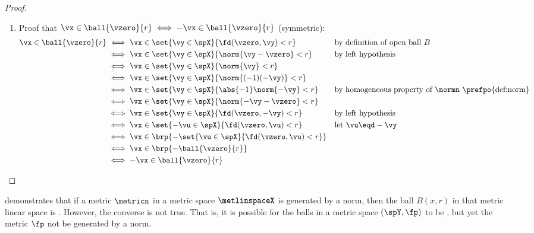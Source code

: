 \begin{proof}
\begin{enumerate}
  \item Proof that $\vx\in \ball{\vzero}{r} \iff -\vx\in \ball{\vzero}{r}$ (symmetric):
        \begin{align*}
          \vx\in \ball{\vzero}{r}
            &\iff \vx\in\set{\vy\in\spX}{\fd(\vzero,\vy)<r}
            &&    \text{by definition of open ball $B$}
          \\&\iff \vx\in\set{\vy\in\spX}{\norm{\vy-\vzero}<r}
            &&    \text{by left hypothesis}
          \\&\iff \vx\in\set{\vy\in\spX}{\norm{\vy}<r}
          \\&\iff \vx\in\set{\vy\in\spX}{\norm{(-1)(-\vy)}<r}
          \\&\iff \vx\in\set{\vy\in\spX}{\abs{-1}\norm{-\vy}<r}
            &&    \text{by homogeneous property of $\normn$ \prefpo{def:norm}}
          \\&\iff \vx\in\set{\vy\in\spX}{\norm{-\vy-\vzero}<r}
          \\&\iff \vx\in\set{\vy\in\spX}{\fd(\vzero,-\vy)<r}
            &&    \text{by left hypothesis}
          \\&\iff \vx\in\set{-\vu\in\spX}{\fd(\vzero,\vu)<r}
            &&    \text{let $\vu\eqd -\vy$}
          \\&\iff \vx\in \brp{-\set{\vu\in\spX}{\fd(\vzero,\vu)<r}}
          \\&\iff \vx\in \brp{-\ball{\vzero}{r}}
          \\&\iff -\vx\in \ball{\vzero}{r}
        \end{align*}
\end{enumerate}
\end{proof}

 demonstrates that if a metric $\metricn$ in a metric space $\metlinspaceX$
is generated by a norm,
then the ball $B(x,r)$ in that metric linear space is .
However, the converse is not true.
That is, it is possible for the balls in a metric space $(\spY,\fp)$ to be ,
but yet the metric $\fp$ not be generated by a norm.

